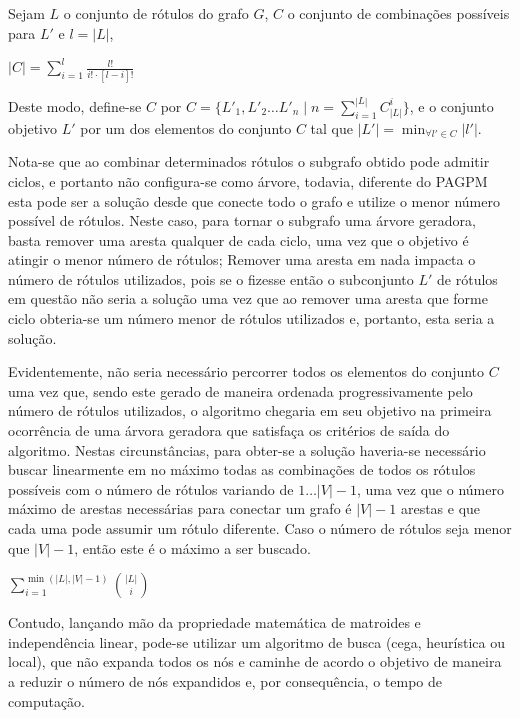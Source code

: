 \documentclass[12pt]{article}
\begin{document}
	Sejam $L$ o conjunto de rótulos do grafo $G$, $C$ o conjunto de combinações possíveis para $L'$ e $l = |L|$,

	\begin{center}
	$\displaystyle{|C| = \sum_{i = 1}^{l}{\frac {l!}{i! \cdot [l-i]!}}}$
	\end{center}

	Deste modo, define-se $C$ por $\displaystyle{C = \{L'_1, L'_2 \dots L'_n \mid n = \sum_{i = 1}^{|L|}{C_{|L|}^{i}}\}}$, e o conjunto objetivo $L'$ por um dos elementos do conjunto $C$ tal que $\displaystyle{|L'| = \min_{\forall l' \in C} |l'|}$.

	Nota-se que ao combinar determinados rótulos o subgrafo obtido pode admitir ciclos, e portanto não configura-se como árvore, todavia, diferente do PAGPM esta pode ser a solução desde que conecte todo o grafo e utilize o menor número possível de rótulos. Neste caso, para tornar o subgrafo uma árvore geradora, basta remover uma aresta qualquer de cada ciclo, uma vez que o objetivo é atingir o menor número de rótulos; Remover uma aresta em nada impacta o número de rótulos utilizados, pois se o fizesse então o subconjunto $L'$ de rótulos em questão não seria a solução uma vez que ao remover uma aresta que forme ciclo obteria-se um número menor de rótulos utilizados e, portanto, esta seria a solução.

	Evidentemente, não seria necessário percorrer todos os elementos do conjunto $C$ uma vez que, sendo este gerado de maneira ordenada progressivamente pelo número de rótulos utilizados, o algoritmo chegaria em seu objetivo na primeira ocorrência de uma árvora geradora que satisfaça os critérios de saída do algoritmo. Nestas circunstâncias, para obter-se a solução haveria-se necessário buscar linearmente em no máximo todas as combinações de todos os rótulos possíveis com o número de rótulos variando de $1 \dots |V| - 1$, uma vez que o número máximo de arestas necessárias para conectar um grafo é $|V| - 1$ arestas e que cada uma pode assumir um rótulo diferente. Caso o número de rótulos seja menor que $|V| - 1$, então este é o máximo a ser buscado.

	\begin{center}
	$\displaystyle{\sum_{i = 1}^{\min (|L|, |V| - 1)}{|L| \choose i}}$
	\end{center}

	Contudo, lançando mão da propriedade matemática de matroides e independência linear, pode-se utilizar um algoritmo de busca (cega, heurística ou local), que não expanda todos os nós e caminhe de acordo o objetivo de maneira a reduzir o número de nós expandidos e, por consequência, o tempo de computação.
\end{document}
